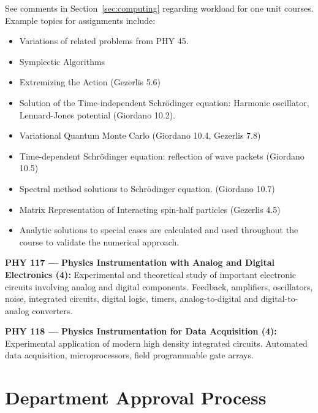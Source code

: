 \documentclass[12pt]{article}
\begin{document}
See comments in Section~\ref{sec:computing} regarding workload for one
unit courses.  Example topics for assignments include:
\begin{itemize}
\item Variations of related problems from PHY 45.
\item Symplectic Algorithms
\item Extremizing the Action (Gezerlis 5.6)
\item Solution of the Time-independent Schr\"odinger equation: 
  Harmonic oscillator, Lennard-Jones potential (Giordano 10.2).
\item Variational Quantum Monte Carlo (Giordano 10.4, Gezerlis 7.8)
\item Time-dependent Schr\"odinger equation:  reflection of wave packets (Giordano 10.5)
\item Spectral method solutions to Schr\"odinger equation.  (Giordano 10.7)
\item Matrix Representation of Interacting spin-half particles (Gezerlis 4.5)
\item Analytic solutions to special cases are calculated and used throughout the course to validate the numerical approach.
\end{itemize}





\vskip 1cm
\noindent
{\bf PHY 117 --- Physics Instrumentation with Analog and Digital Electronics (4):}  
Experimental and theoretical study of important electronic circuits
involving analog and digital components.  Feedback, amplifiers,
oscillators, noise, integrated circuits, digital logic, timers,
analog-to-digital and digital-to-analog converters.

\vskip 1cm
\noindent 
{\bf PHY 118 --- Physics Instrumentation for Data Acquisition (4):}  
Experimental application of modern high density integrated circuits.
Automated data acquisition,  microprocessors, field programmable gate arrays.

\newpage

\section{Department Approval Process}
\label{sec:approval}
\end{document}
